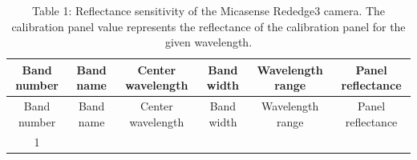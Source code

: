 \documentclass[]{article}
\begin{document}
\begin{longtable}[]{@{}cccccc@{}}
\caption{Table 1: Reflectance sensitivity of the Micasense Rededge3
camera. The calibration panel value represents the reflectance of the
calibration panel for the given wavelength.}\tabularnewline
\toprule
\begin{minipage}[b]{0.10\columnwidth}\centering\strut
Band number\strut
\end{minipage} & \begin{minipage}[b]{0.23\columnwidth}\centering\strut
Band name\strut
\end{minipage} & \begin{minipage}[b]{0.14\columnwidth}\centering\strut
Center wavelength\strut
\end{minipage} & \begin{minipage}[b]{0.09\columnwidth}\centering\strut
Band width\strut
\end{minipage} & \begin{minipage}[b]{0.14\columnwidth}\centering\strut
Wavelength range\strut
\end{minipage} & \begin{minipage}[b]{0.14\columnwidth}\centering\strut
Panel reflectance\strut
\end{minipage}\tabularnewline
\midrule
\endfirsthead
\toprule
\begin{minipage}[b]{0.10\columnwidth}\centering\strut
Band number\strut
\end{minipage} & \begin{minipage}[b]{0.23\columnwidth}\centering\strut
Band name\strut
\end{minipage} & \begin{minipage}[b]{0.14\columnwidth}\centering\strut
Center wavelength\strut
\end{minipage} & \begin{minipage}[b]{0.09\columnwidth}\centering\strut
Band width\strut
\end{minipage} & \begin{minipage}[b]{0.14\columnwidth}\centering\strut
Wavelength range\strut
\end{minipage} & \begin{minipage}[b]{0.14\columnwidth}\centering\strut
Panel reflectance\strut
\end{minipage}\tabularnewline
\midrule
\endhead
\begin{minipage}[t]{0.10\columnwidth}\centering\strut
1\strut
\end{minipage} & \begin{minipage}[t]{0.23\columnwidth}\centering\strut

\end{minipage}
\end{longtable}
\end{document}
